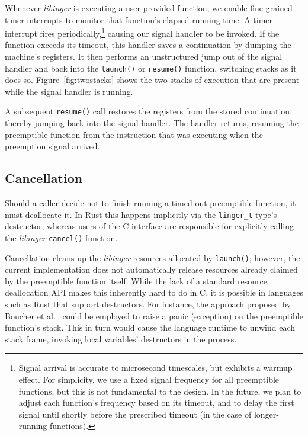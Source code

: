Whenever \textit{libinger} is executing a user-provided function, we
enable fine-grained timer interrupts to
monitor that function's elapsed running time.  A timer interrupt fires
periodically,\footnote{Signal arrival is accurate to microsecond timescales, but
exhibits a warmup effect.  For simplicity, we use a fixed signal frequency for all
preemptible functions, but this is not fundamental to the design.  In the future,
we plan to adjust each function's frequency based on its timeout, and to delay the
first signal until shortly before the prescribed timeout (in the case of
longer-running functions).} causing our signal
handler to be invoked.  If the function exceeds its timeout,
this handler saves a continuation by dumping the machine's registers.  It then
performs an unstructured jump out of the signal handler and back into the
\texttt{launch()} or \texttt{resume()} function, switching stacks as it does so.
Figure~\ref{fig:twostacks} shows the two stacks of execution
that are present while the
signal handler is running.

A subsequent \texttt{resume()} call restores the registers from the stored
continuation, thereby jumping back into the signal handler.  The handler
returns, resuming the preemptible function from the instruction that was executing
when the preemption signal arrived.





\subsection{Cancellation}

Should a caller decide not to finish running a timed-out preemptible function, it
must deallocate it.  In Rust this happens implicitly via the \texttt{linger\_t}
type's destructor, whereas users of the C interface are responsible for explicitly
calling the \textit{libinger} \texttt{cancel()} function.

Cancellation cleans up the \textit{libinger} resources allocated by
\texttt{launch()};
however, the current implementation
does not automatically release resources already claimed by the
preemptible function itself.  While the lack of a standard resource deallocation API
makes this inherently hard to do in C, it is possible in languages
such as Rust that support destructors.  For instance, the approach proposed by
Boucher et al.~\cite{boucher:atc2018} could be employed to raise a panic
(exception) on the preemptible function's stack.  This in turn would cause the
language runtime
to unwind each stack frame, invoking local variables' destructors in
the process.


